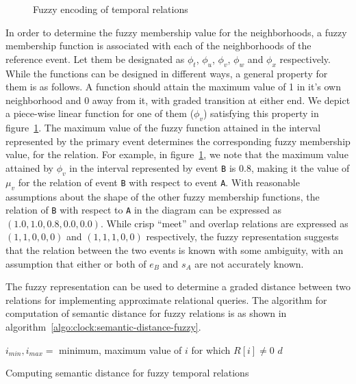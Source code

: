 \begin{figure}[htbp!]
	\centerline{
	}
	\caption{Fuzzy encoding of temporal relations}
	\label{fig:clock:Wattamwar}
\end{figure}


In order to determine the fuzzy membership value for the neighborhoods, a fuzzy membership function is associated with each of 
the neighborhoods of the reference event. Let them be designated as $\phi_t$, $\phi_u$, $\phi_v$, $\phi_w$ and $\phi_x$ respectively. 
%
While the functions can be designed in different ways, a general property for them is as follows. A function should attain the maximum
value of 1 in it's own neighborhood and 0 away from it, with graded transition at either end. We depict a piece-wise linear 
function for one of them ($\phi_v$) satisfying this property in figure~\ref{fig:clock:Wattamwar}. 
%
The maximum value of the fuzzy function attained in the interval represented by the primary event determines the corresponding 
fuzzy membership value, for the relation. For example, in figure~\ref{fig:clock:Wattamwar}, we note that the maximum value attained 
by $\phi_v$ in the interval represented by event \texttt{B} is 0.8, making it the value of $\mu_v$ for the relation of event \texttt{B} 
with respect to event \texttt{A}. With reasonable assumptions about the shape of the other fuzzy membership functions, the
relation of \texttt{B} with respect to \texttt{A} in the diagram can be expressed as $(1.0, 1.0, 0.8, 0.0, 0.0)$. While crisp
``meet'' and overlap relations are expressed as $(1,1,0,0,0)$ and $(1,1,1,0,0)$ respectively, the fuzzy representation suggests
that the relation between the two events is known with some ambiguity, with an assumption that either or both of $e_B$ and $s_A$
are not accurately known. 
 
The fuzzy representation can be used to determine a graded distance between two relations for implementing approximate
relational queries. The algorithm for computation of semantic distance for fuzzy relations is as shown in 
algorithm~\ref{algo:clock:semantic-distance-fuzzy}. 


\begin{algorithm}[!htbp]
	\SetAlgoLined
	\DontPrintSemicolon
	 {
		$i_{min}, i_{max} =$ minimum, maximum value of $i$ for which $R[i] \neq 0$\;
		\Return $d$\;
	} %
	\caption{Computing semantic distance for fuzzy temporal relations}
	\label{algo:clock:semantic-distance-fuzzy}
\end{algorithm}

